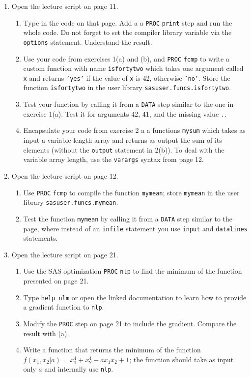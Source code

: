 \begin{enumerate}
\item Open the lecture script on page 11.
\begin{enumerate}
\item Type in the code on that page. Add a a \texttt{PROC} \texttt{print} step and run the whole code. Do not forget to set the compiler library variable via the \texttt{options} statement. Understand the result.
\item Use your code from exercises 1(a) and (b), and \texttt{PROC} \texttt{fcmp} to write a custom function with name \texttt{isfortytwo} which takes one argument called \texttt{x} and returns \texttt{'yes'} if the value of \texttt{x} is 42, otherwise \texttt{'no'}. Store the function \texttt{isfortytwo} in the user library \texttt{sasuser.funcs.isfortytwo}.
\item Test your function by calling it from a \texttt{DATA} step similar to the one in exercise 1(a). Test it for arguments 42, 41, and the missing value \texttt{.}.
\item Encapsulate your code from exercise 2 a a functions \texttt{mysum} which takes as input a variable length array and returns as output the sum of its elements (without the \texttt{output} statement in 2(b)). To deal with the variable array length, use the \texttt{varargs} syntax from page 12.
\end{enumerate}

\item Open the lecture script on page 12.
\begin{enumerate}
\item Use \texttt{PROC} \texttt{fcmp} to compile the function \texttt{mymean}; store \texttt{mymean} in the user library \texttt{sasuser.funcs.mymean}.
\item Test the function \texttt{mymean} by calling it from a \texttt{DATA} step similar to the page, where instead of an \texttt{infile} statement you use \texttt{input} and \texttt{datalines} statements.
\end{enumerate}

\item Open the lecture script on page 21.
\begin{enumerate}
\item Use the SAS optimization \texttt{PROC} \texttt{nlp} to find the minimum of the function presented on page 21.
\item Type \texttt{help nlm} or open the linked documentation to learn how to provide a gradient function to \texttt{nlp}.
\item Modify the \texttt{PROC} step on page 21 to include the gradient. Compare the result with (a).
\item Write a function that returns the minimum of the function $f(x_1,x_2|a) = x_1^4+x_2^4-ax_1x_2 + 1$; the function should take as input only $a$ and internally use \texttt{nlp}.
\end{enumerate}

\end{enumerate}





